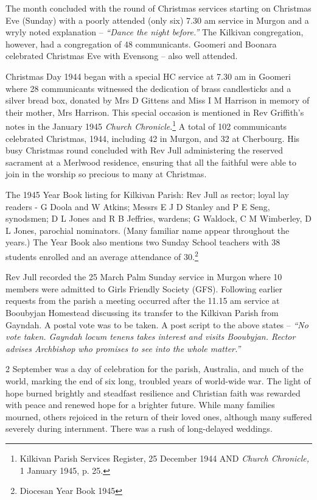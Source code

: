 The month concluded with the round of Christmas services starting on Christmas Eve (Sunday) with a poorly attended (only six) 7.30 am service in Murgon and a wryly noted explanation -- \emph{``Dance the night before.''} The Kilkivan congregation, however, had a congregation of 48 communicants. Goomeri and Boonara celebrated Christmas Eve with Evensong -- also well attended.



Christmas Day 1944 began with a special HC service at 7.30 am in Goomeri where 28 communicants witnessed the dedication of brass candlesticks and a silver bread box, donated by Mrs D Gittens and Miss I M Harrison in memory of their mother, Mrs Harrison. This special occasion is mentioned in Rev Griffith's notes in the January 1945 \emph{Church Chronicle}.\footnote{Kilkivan Parish Services Register, 25 December 1944 AND \emph{Church Chronicle,} 1 January 1945, p. 25.} A total of 102 communicants celebrated Christmas, 1944, including 42 in Murgon, and 32 at Cherbourg. His busy Christmas round concluded with Rev Jull administering the reserved sacrament at a Merlwood residence, ensuring that all the faithful were able to join in the worship so precious to many at Christmas.


The 1945 Year Book listing for Kilkivan Parish: Rev Jull as rector; loyal lay readers - G Doola and W Atkins; Messrs E J D Stanley and P E Seng, synodsmen; D L Jones and R B Jeffries, wardens; G Waldock, C M Wimberley, D L Jones, parochial nominators. (Many familiar name appear throughout the years.) The Year Book also mentions two Sunday School teachers with 38 students enrolled and an average attendance of 30.\footnote{Diocesan Year Book 1945}


Rev Jull recorded the 25 March Palm Sunday service in Murgon where 10 members were admitted to Girls Friendly Society (GFS). Following earlier requests from the parish a meeting occurred after the 11.15 am service at Booubyjan Homestead discussing its transfer to the Kilkivan Parish from Gayndah. A postal vote was to be taken. A post script to the above states -- \emph{``No vote taken. Gayndah locum tenens takes interest and visits Booubyjan. Rector advises Archbishop who promises to see into the whole matter.''}



2 September was a day of celebration for the parish, Australia, and much of the world, marking the end of six long, troubled years of world-wide war. The light of hope burned brightly and steadfast resilience and Christian faith was rewarded with peace and renewed hope for a brighter future. While many families mourned, others rejoiced in the return of their loved ones, although many suffered severely during internment. There was a rush of long-delayed weddings.









